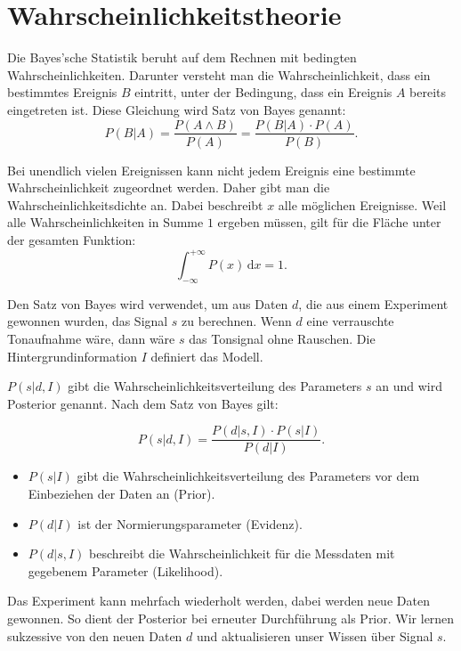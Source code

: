 \section{Wahrscheinlichkeitstheorie}\label{k4.2.bayes}

Die Bayes'sche Statistik beruht auf dem Rechnen mit bedingten Wahrscheinlichkeiten. Darunter versteht man die Wahrscheinlichkeit, dass ein bestimmtes Ereignis $B$ eintritt, unter der Bedingung, dass ein Ereignis $A$ bereits eingetreten ist. Diese Gleichung wird Satz von Bayes genannt:
\begin{equation}
P(B|A) = \frac{P(A \wedge B)}{P(A)} = \frac{P(B|A)\cdot P(A)}{P(B)}.
\end{equation}

Bei unendlich vielen Ereignissen kann nicht jedem Ereignis eine bestimmte Wahrscheinlichkeit zugeordnet werden. Daher gibt man die Wahrscheinlichkeitsdichte an. Dabei beschreibt $x$ alle möglichen Ereignisse. Weil alle Wahrscheinlichkeiten in Summe $1$ ergeben müssen, gilt für die Fläche unter der gesamten Funktion:
\begin{equation}
\int_{- \infty }^ {+ \infty} P(x) \,\mbox{d}x = 1.
\end{equation}

Den Satz von Bayes wird verwendet, um aus Daten $d$, die aus einem Experiment gewonnen wurden, das Signal $s$ zu berechnen. Wenn $d$ eine verrauschte Tonaufnahme wäre, dann wäre $s$ das Tonsignal ohne Rauschen. Die Hintergrundinformation $I$ definiert das Modell. 


 
 $P(s|d,I)$ gibt die Wahrscheinlichkeitsverteilung des Parameters $s$ an und wird Posterior genannt. Nach dem Satz von Bayes gilt:
 
\begin{equation}
P(s|d,I) = \frac{P(d|s,I)\cdot P(s|I)}{P(d|I)}.
\end{equation}

\begin{itemize}
 \item $P(s|I)$ gibt die Wahrscheinlichkeitsverteilung des Parameters vor dem Einbeziehen der Daten an (Prior).
 \item $P(d|I)$ ist der Normierungsparameter (Evidenz).
 \item $P(d|s,I)$ beschreibt die Wahrscheinlichkeit für die Messdaten mit gegebenem Parameter (Likelihood). \label{k4.2.likelihood}
\end{itemize}

Das Experiment kann mehrfach wiederholt werden, dabei werden neue Daten gewonnen. So dient der Posterior bei erneuter Durchführung als Prior. Wir lernen sukzessive von den neuen Daten $d$ und aktualisieren unser Wissen über Signal $s$.
